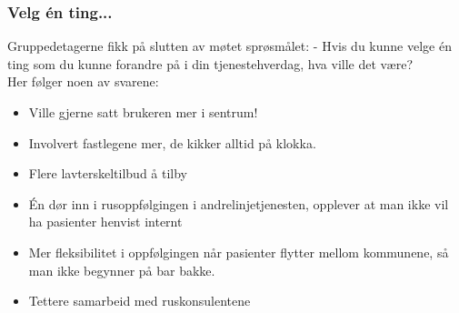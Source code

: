 \documentclass[11pt]{report} %
\begin{document}
                    \subsubsection{Velg én ting...}
                      Gruppedetagerne fikk på slutten av møtet sprøsmålet: - Hvis du kunne velge én ting som du kunne forandre på i din tjenestehverdag, hva ville det være?\\
                      Her følger noen av svarene:
                        \begin{itemize}
                          \item Ville gjerne satt brukeren mer i sentrum!\\
                          \item Involvert fastlegene mer, de kikker alltid på klokka.\\
                          \item Flere lavterskeltilbud å tilby\\
                          \item Én dør inn i rusoppfølgingen i andrelinjetjenesten, opplever at man ikke vil ha pasienter henvist internt\\
                          \item Mer fleksibilitet i oppfølgingen når pasienter flytter mellom kommunene, så man ikke begynner på bar bakke.\\
                          \item Tettere samarbeid med ruskonsulentene\\
                        \end{itemize}
\end{document}
